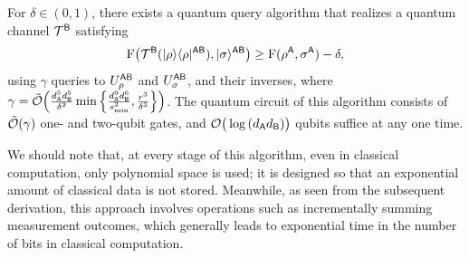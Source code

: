 \begin{theorem}
\label{prevthm:Metger&Yuen's result}
For $\delta \in (0, 1)$, there exists a quantum query algorithm that realizes a quantum channel ${\mathcal{T}}^{\mathsf{B}}$ satisfying 
\begin{align}
    {\mathrm{F}}\big({\mathcal{T}}^{\mathsf{B}}(|\rho\rangle\langle\rho|^{{\mathsf{A}}{\mathsf{B}}}), |\sigma\rangle^{{\mathsf{A}}{\mathsf{B}}}\big) \geq {\mathrm{F}}(\rho^{\mathsf{A}}, \sigma^{\mathsf{A}}) - \delta,
\end{align}
using $\gamma$ queries to $U_\rho^{{\mathsf{A}}{\mathsf{B}}}$ and $U_\sigma^{{\mathsf{A}}{\mathsf{B}}}$, and their inverses, where $\gamma = \tilde{{\mathcal{O}}}\Big(\frac{d_{\mathsf{A}}^5 d_{\mathsf{B}}^5}{\delta^2}\min\Big\{\frac{d_{\mathsf{A}}^9 d_{\mathsf{B}}^6}{s_{\rm min}^3}, \frac{r^3}{\delta^3}\Big\}\Big)$. The quantum circuit of this algorithm consists of $\tilde{{\mathcal{O}}}(\gamma)$ one- and two-qubit gates, and ${\mathcal{O}}\big(\log{(d_{\mathsf{A}}d_{\mathsf{B}})}\big)$ qubits suffice at any one time.
\end{theorem}



We should note that, at every stage of this algorithm, even in classical computation, only polynomial space is used; it is designed so that an exponential amount of classical data is not stored.
Meanwhile, as seen from the subsequent derivation, this approach involves operations such as incrementally summing measurement outcomes, which generally leads to exponential time in the number of bits in classical computation.





